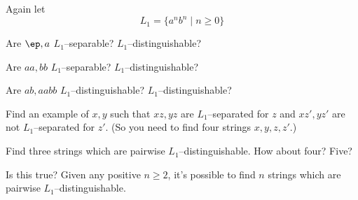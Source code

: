  Again let
  \[
  L_1 = \{a^n b^n \mid n \geq 0\}
  \]
  \begin{tightlist}
  \item Are $\ep, a$ $L_1$--separable? $L_1$--distinguishable?
  \item Are $aa, bb$ $L_1$--separable? $L_1$--distinguishable?
  \item Are $ab, aabb$ $L_1$--distinguishable? $L_1$--distinguishable?
  \item Find an example of $x,y$ such that
    $xz, yz$ are $L_1$--separated for $z$ and
    $xz', yz'$ are not $L_1$--separated for $z'$.
    (So you need to find four strings $x,y,z,z'$.)
  \item Find three strings which are pairwise $L_1$--distinguishable.
    How about four? Five?
  \item Is this true? Given any positive $n \geq 2$,
    it's possible to find $n$ strings which are
    pairwise $L_1$--distinguishable.
  \end{tightlist}
